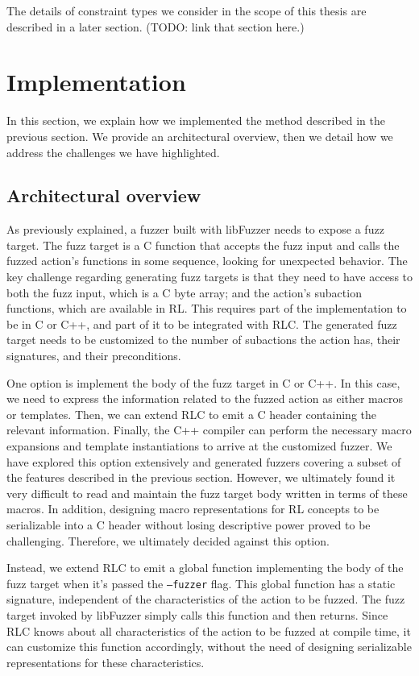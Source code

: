 The details of constraint types we consider in the scope of this thesis are described in a later section. (TODO: link that section here.)

\section{Implementation}
In this section, we explain how we implemented the method described in the previous section.
We provide an architectural overview, then we detail how we address the challenges we have highlighted.

\subsection{Architectural overview}
As previously explained, a fuzzer built with libFuzzer needs to expose a fuzz target.
The fuzz target is a C function that accepts the fuzz input and calls the fuzzed action's functions in some sequence, looking for unexpected behavior.
The key challenge regarding generating fuzz targets is that they need to have access to both the fuzz input, which is a C byte array; and the action's subaction functions, which are available in RL.
This requires part of the implementation to be in C or C++, and part of it to be integrated with RLC.
The generated fuzz target needs to be customized to the number of subactions the action has, their signatures, and their preconditions.

One option is implement the body of the fuzz target in C or C++.
In this case, we need to express the information related to the fuzzed action as either macros or templates.
Then, we can extend RLC to emit a C header containing the relevant information.
Finally, the C++ compiler can perform the necessary macro expansions and template instantiations to arrive at the customized fuzzer.
We have explored this option extensively and generated fuzzers covering a subset of the features described in the previous section.
However, we ultimately found it very difficult to read and maintain the fuzz target body written in terms of these macros.
In addition, designing macro representations for RL concepts to be serializable into a C header without losing descriptive power proved to be challenging.
Therefore, we ultimately decided against this option.

Instead, we extend RLC to emit a global function implementing the body of the fuzz target when it's passed the \texttt{--fuzzer} flag.
This global function has a static signature, independent of the characteristics of the action to be fuzzed.
The fuzz target invoked by libFuzzer simply calls this function and then returns.
Since RLC knows about all characteristics of the action to be fuzzed at compile time, it can customize this function accordingly, without the need of designing serializable representations for these characteristics.

